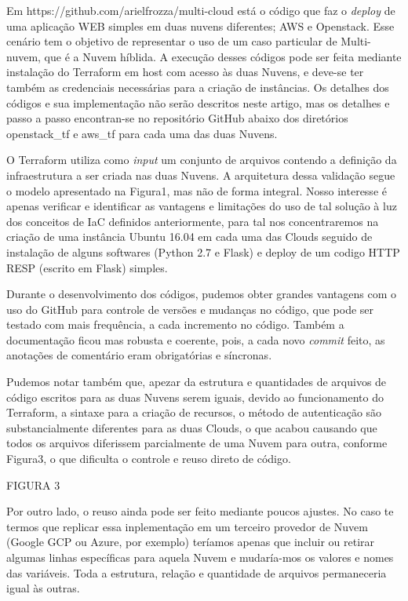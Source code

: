 \documentclass[12pt]{article}
\begin{document}
	Em https://github.com/arielfrozza/multi-cloud está o código que faz o \textit{deploy} de uma aplicação WEB simples em duas nuvens diferentes; AWS e Openstack. Esse cenário tem o objetivo de representar o uso de um caso particular de Multi-nuvem, que é a Nuvem híblida. A execução desses códigos pode ser feita mediante instalação do Terraform em host com acesso às duas Nuvens, e deve-se ter também as credenciais necessárias para a criação de instâncias. Os detalhes dos códigos e sua implementação não serão descritos neste artigo, mas os detalhes e passo a passo encontran-se no repositório GitHub abaixo dos diretórios openstack\_tf e aws\_tf para cada uma das duas Nuvens.
	
	O Terraform utiliza como \textit{input} um conjunto de arquivos contendo a definição da infraestrutura a ser criada nas duas Nuvens. A arquitetura dessa validação segue o modelo apresentado na Figura1, mas não de forma integral. Nosso interesse é apenas verificar e identificar as vantagens e limitações do uso de tal solução à luz dos conceitos de IaC definidos anteriormente, para tal nos concentraremos na criação de uma instância Ubuntu 16.04 em cada uma das Clouds seguido de instalação de alguns softwares (Python 2.7 e Flask) e deploy de um codigo HTTP RESP (escrito em Flask) simples.	
	
	Durante o desenvolvimento dos códigos, pudemos obter grandes vantagens com o uso do GitHub para controle de versões e mudanças no código, que pode ser testado com mais frequência, a cada incremento no código. Também a documentação ficou mas robusta e coerente, pois, a cada novo \textit{commit} feito, as anotações de comentário eram obrigatórias e síncronas.
	
	Pudemos notar também que, apezar da estrutura e quantidades de arquivos de código escritos para as duas Nuvens serem iguais, devido ao funcionamento do Terraform, a sintaxe para a criação de recursos, o método de autenticação são substancialmente diferentes para as duas Clouds, o que acabou causando que todos os arquivos diferissem parcialmente de uma Nuvem para outra, conforme Figura3, o que dificulta o controle e reuso direto de código.
	
	FIGURA 3
	
	Por outro lado, o reuso ainda pode ser feito mediante poucos ajustes. No caso te termos que replicar essa inplementação em um terceiro provedor de Nuvem (Google GCP ou Azure, por exemplo) teríamos apenas que incluir ou retirar algumas linhas específicas para aquela Nuvem e mudaría-mos os valores e nomes das variáveis. Toda a estrutura, relação e quantidade de arquivos permaneceria igual às outras. 
	
\end{document}
